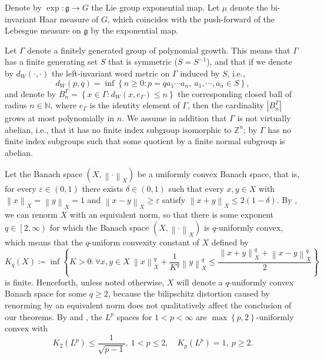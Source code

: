 \documentclass[11pt,reqno]{amsart}
\newcommand{\1}{\mathbf 1}
\begin{document}
Denote by $\exp:\mathfrak{g}\to G$ the Lie group exponential map. Let $\mu$ denote the bi-invariant Haar measure of $G$, which coincides with the push-forward of the Lebesgue measure on $\mathfrak{g}$ by the exponential map.

Let $\Gamma$ denote a finitely generated group of polynomial growth. This means that $\Gamma$ has a finite generating set $S$ that is symmetric ($S=S^{-1}$), and that if we denote by $d_W\left(\cdot,\cdot\right)$ the left-invariant word metric on $\Gamma$ induced by $S$, i.e.,
\[
d_W\left(p,q\right)=\inf\left\{n\ge 0:p=qa_1\cdots a_n,~a_1,\cdots,a_n\in S\right\},
\]
and denote by $B_n^\Gamma=\left\{x\in \Gamma: d_W\left(x,e_\Gamma\right)\le n\right\}$ the corresponding closed ball of radius $n\in \mathbb{N}$, where $e_\Gamma$ is the identity element of $\Gamma$, then the cardinality $\left|B^\Gamma_n\right|$ grows at most polynomially in $n$. We assume in addition that $\Gamma$ is not virtually abelian, i.e., that it has no finite index subgroup isomorphic to $\mathbb{Z}^n$; by \cite[Corollary 1.5]{de2007isometric} $\Gamma$ has no finite index subgroups such that some quotient by a finite normal subgroup is abelian.

Let the Banach space $\left(X,\left\|\cdot\right\|_X\right)$ be a uniformly convex Banach space, that is, for every $\varepsilon\in \left(0,1\right)$ there exists $\delta\in \left(0,1\right)$ such that every $x,y\in X$ with $\left\|x\right\|_X=\left\|y\right\|_X=1$ and $\left\|x-y\right\|_X\ge \varepsilon$ satisfy $\left\|x+y\right\|_X\le 2\left(1-\delta\right)$. By \cite{ball1994sharp,figiel1976moduli,pisier1975martingales}, we can renorm $X$ with an equivalent norm, so that there is some exponent $q\in \left[2,\infty\right)$ for which the Banach space $\left(X,\left\|\cdot\right\|_X\right)$ is $q$-uniformly convex, which means that the $q$-uniform convexity constant of $X$ defined by
\begin{equation}\label{eq:unif-cvx-def}
K_q\left(X\right)\coloneqq \inf\left\{K>0:\forall x,y\in X~\left\|x\right\|_X^q+\frac{1}{K^q}\left\|y\right\|_X^q\le \frac{\left\|x+y\right\|_X^q+\left\|x-y\right\|_X^q}{2}\right\}
\end{equation}
is finite. Henceforth, unless noted otherwise, $X$ will denote a $q$-uniformly convex Banach space for some $q\ge 2$, because the bilipschitz distortion caused by renorming by an equivalent norm does not qualitatively affect the conclusion of our theorems. By \cite{hanner1956uniform} and \cite{ball1994sharp}, the $L^p$ spaces for $1<p<\infty$ are $\max\left\{p,2\right\}$-uniformly convex with
\begin{equation}\label{eq:unifcvxlp}
K_2\left(L^p\right)\le \frac{1}{\sqrt{p-1}},~1<p\le 2,\quad K_p\left(L^p\right)= 1,~p\ge 2.
\end{equation}
\end{document}
